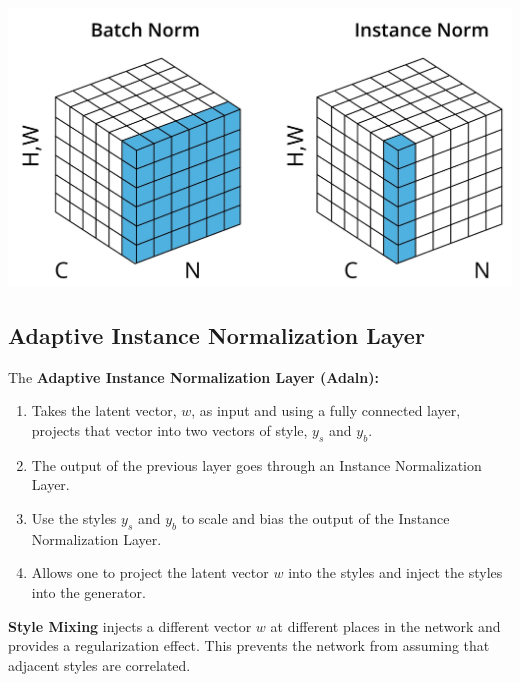 \includegraphics[width=0.5\linewidth]{img//genAdvNet//modernGAN/screen-shot-2022-06-30-at-6.23.29-pm.jpeg}

\subsection{Adaptive Instance Normalization Layer}
The \textbf{Adaptive Instance Normalization Layer (Adaln):}

\begin{enumerate}
    \item Takes the latent vector, \(w\), as input and using a fully connected layer, projects that vector into two vectors of style, \(y_s\) and \(y_b\).
    \item The output of the previous layer goes through an Instance Normalization Layer.
    \item Use the styles \(y_s\) and \(y_b\) to scale and bias the output of the Instance Normalization Layer.
    \item Allows one to project the latent vector \(w\) into the styles and inject the styles into the generator.
\end{enumerate}
\textbf{Style Mixing} injects a different vector \(w\) at different places in the network and provides a regularization effect. This prevents the network from assuming that adjacent styles are correlated.

